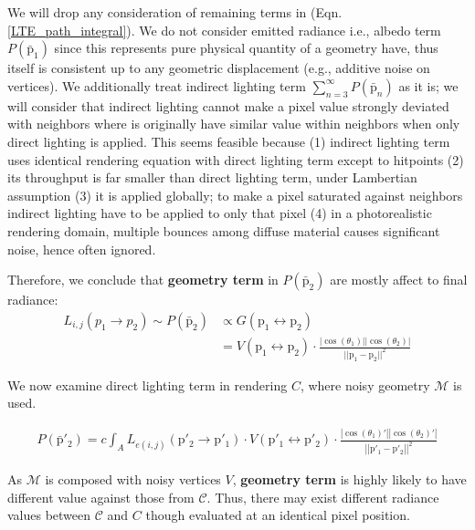 We will drop any consideration of remaining terms in (Eqn. \ref{LTE_path_integral}). We do not consider emitted radiance i.e., albedo term $\mathit{P}\left(\bar{\mathrm{p}}_1\right)$ since this represents pure physical quantity of a geometry have, thus itself is consistent up to any geometric displacement (e.g., additive noise on vertices).
We additionally treat indirect lighting term $\sum_{n=3}^\infty \mathit{P}(\bar{\mathrm{p}}_n)$ as it is; we will consider that indirect lighting cannot make a pixel value strongly deviated with neighbors where is originally have similar value within neighbors when only direct lighting is applied. 
This seems feasible because (1) indirect lighting term uses identical rendering equation with direct lighting term except to hitpoints (2) its throughput is far smaller than direct lighting term, under Lambertian assumption (3) it is applied globally; to make a pixel saturated against neighbors indirect lighting have to be applied to only that pixel (4) in a photorealistic rendering domain, multiple bounces among diffuse material causes significant noise, hence often ignored\cite{moon2013robust}.

Therefore, we conclude that \textbf{geometry term} in $\mathit{P}(\bar{\mathrm{p}}_2)$ are mostly affect to final radiance: 
\begin{align}
    L_{i,j}(p_1 \rightarrow p_2) \sim \mathit{P}(\bar{\mathrm{p}}_2) & \propto G(\mathrm{p}_1 \leftrightarrow \mathrm{p}_2) \nonumber \\
    & =V(\mathrm{p}_1 \leftrightarrow \mathrm{p}_2) \cdot \frac{|\cos(\theta_1)||\cos(\theta_2)|}{||\mathrm{p}_1-\mathrm{p}_2||^2}
    \label{eqn:relationship_between_radiance_and_geometry}
\end{align}

We now examine direct lighting term in rendering $C$, where noisy geometry $\mathcal{M}$ is used.

\begin{align}
    \mathit{P}\left(\bar{\mathrm{p}}'_2\right) = c\int_A L_{e(i,j)}(\mathrm{p}'_2\rightarrow \mathrm{p}'_1) \cdot V(\mathrm{p}'_1 \leftrightarrow \mathrm{p}'_2) \cdot \frac{\left|\cos(\theta_1)'\right|\left|\cos(\theta_2)'\right|}{\left|\left|\mathrm{p}'_1-\mathrm{p}'_2\right|\right|^2} \nonumber
    \label{LTE_path_integral_direct_lighting_SLAM}
\end{align}

As $\mathcal{M}$ is composed with noisy vertices $V$, \textbf{geometry term} is highly likely to have different value against those from $\mathcal{C}$. 
Thus, there may exist different radiance values between $\mathcal{C}$ and $C$ though evaluated at an identical pixel position.

